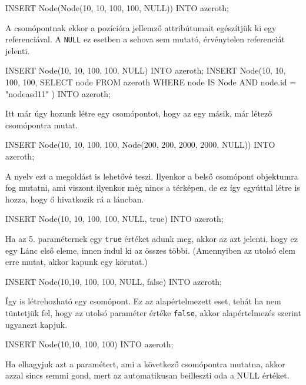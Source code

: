 \begin{sql}
INSERT Node(Node(10, 10, 100, 100, NULL)) INTO azeroth;
\end{sql}

A csomópontnak ekkor a pozícióra jellemző attribútumait egészítjük ki egy referenciával. A \texttt{NULL} ez esetben a sehova sem mutató, érvénytelen referenciát jelenti.

\begin{sql}
INSERT Node(10, 10, 100, 100, NULL) INTO azeroth;
INSERT Node(10, 10, 100, 100,
    SELECT node FROM azeroth
    WHERE node IS Node AND node.id = "nodeasd11"
) INTO azeroth;
\end{sql}

Itt már úgy hozunk létre egy csomópontot, hogy az egy másik, már létező csomópontra mutat.

\begin{sql}
INSERT Node(10, 10, 100, 100, Node(200, 200, 2000, 2000, NULL))
INTO azeroth;
\end{sql}

A nyelv ezt a megoldást is lehetővé teszi. Ilyenkor a belső csomópont objektumra fog mutatni, ami viszont ilyenkor még nincs a térképen, de ez így egyúttal létre is hozza, hogy ő hivatkozik rá a láncban.

\begin{sql}
INSERT Node(10, 10, 100, 100, NULL, true) INTO azeroth;
\end{sql}

Ha az 5. paraméternek egy \texttt{true} értéket adunk meg, akkor az azt jelenti, hogy ez egy Lánc első eleme, innen indul ki az összes többi. (Amennyiben az utolsó elem erre mutat, akkor kapunk egy körutat.)

\begin{sql}
INSERT Node(10,10, 100, 100, NULL, false) INTO azeroth;
\end{sql}

Így is létrehozható egy csomópont. Ez az alapértelmezett eset, tehát ha nem tüntetjük fel, hogy az utolsó paraméter értéke \texttt{false}, akkor alapértelmezés szerint ugyanezt kapjuk.

\begin{sql}
INSERT Node(10,10, 100, 100) INTO azeroth;
\end{sql}
Ha elhagyjuk azt a paramétert, ami a következő csomópontra mutatna, akkor azzal sincs semmi gond, mert az automatikusan beilleszti oda a NULL értéket.

